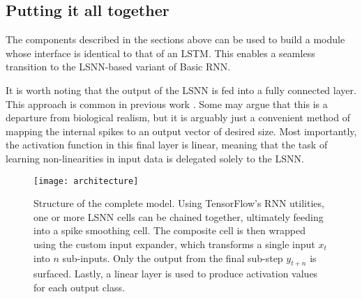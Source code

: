 \documentclass[../../report.tex]{subfiles}
\begin{document}
\subsection{Putting it all together}

The components described in the sections above can be used to build a module
whose interface is identical to that of an LSTM. This enables a seamless
transition to the LSNN-based variant of Basic RNN.

It is worth noting that the output of the LSNN is fed into a fully connected
layer. This approach is common in previous work \cite{Bellec2018LSNN,
Bellec2020}. Some may argue that this is a departure from biological realism,
but it is arguably just a convenient method of mapping the internal spikes to an
output vector of desired size. Most importantly, the activation function in this
final layer is linear, meaning that the task of learning non-linearities in
input data is delegated solely to the LSNN.

\begin{figure}
  \centering
  \texttt{[image: architecture]}
  \caption{Structure of the complete model. Using TensorFlow's RNN utilities,
  one or more LSNN cells can be chained together, ultimately feeding into a
  spike smoothing cell. The composite cell is then wrapped using the custom
  input expander, which transforms a single input \(x_t\) into \(n\) sub-inputs.
  Only the output from the final sub-step \(y_{t+n}\) is surfaced. Lastly, a
  linear layer is used to produce activation values for each output class.}
  \label{fig:architecture}
\end{figure}
\end{document}
